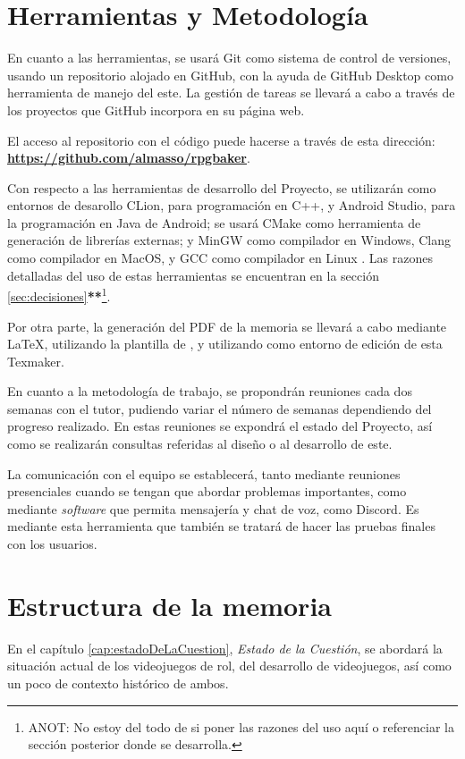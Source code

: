 \section{Herramientas y Metodología}
En cuanto a las herramientas, se usará Git como sistema de control de versiones, usando un repositorio alojado en GitHub, con la ayuda de GitHub Desktop como herramienta de manejo del este. La gestión de tareas se llevará a cabo a través de los proyectos que GitHub incorpora en su página web.

\smallskip

El acceso al repositorio con el código puede hacerse a través de esta dirección: \href{https://github.com/almasso/rpgbaker}{\textbf{https://github.com/almasso/rpgbaker}}.

\medskip

Con respecto a las herramientas de desarrollo del Proyecto, se utilizarán como entornos de desarollo CLion, para programación en C++, y Android Studio, para la programación en Java de Android; se usará CMake como herramienta de generación de librerías externas; y MinGW como compilador en Windows, Clang como compilador en MacOS, y GCC como compilador en Linux . Las razones detalladas del uso de estas herramientas se encuentran en la sección \ref{sec:decisiones}\textbf{**}\footnote{ANOT: No estoy del todo de si poner las razones del uso aquí o referenciar la sección posterior donde se desarrolla.}.

\medskip

Por otra parte, la generación del PDF de la memoria se llevará a cabo mediante \LaTeX , utilizando la plantilla de \texis , y utilizando como entorno de edición de esta Texmaker.

\bigskip

En cuanto a la metodología de trabajo, se propondrán reuniones cada dos semanas con el tutor, pudiendo variar el número de semanas dependiendo del progreso realizado. En estas reuniones se expondrá el estado del Proyecto, así como se realizarán consultas referidas al diseño o al desarrollo de este.

\medskip

La comunicación con el equipo se establecerá, tanto mediante reuniones presenciales cuando se tengan que abordar problemas importantes, como mediante \textit{software} que permita mensajería y chat de voz, como Discord. Es mediante esta herramienta que también se tratará de hacer las pruebas finales con los usuarios.

\section{Estructura de la memoria} 
En el capítulo \ref{cap:estadoDeLaCuestion}, \textit{Estado de la Cuestión}, se abordará la situación actual de los videojuegos de rol, del desarrollo de videojuegos, así como un poco de contexto histórico de ambos.


